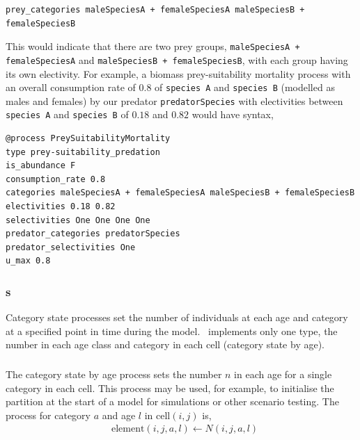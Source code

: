 {\small{\begin{verbatim}
prey_categories maleSpeciesA + femaleSpeciesA maleSpeciesB + femaleSpeciesB
\end{verbatim}}}

This would indicate that there are two prey groups, \texttt{maleSpeciesA + femaleSpeciesA} and \texttt{maleSpeciesB + femaleSpeciesB}, with each group having its own electivity. For example, a biomass prey-suitability mortality process with an overall consumption rate of $0.8$ of \texttt{species A} and \texttt{species B} (modelled as males and females) by our predator \texttt{predatorSpecies} with electivities between \texttt{species A} and \texttt{species B} of $0.18$ and $0.82$ would have syntax,

{\small{\begin{verbatim}
@process PreySuitabilityMortality
type prey-suitability_predation
is_abundance F
consumption_rate 0.8
categories maleSpeciesA + femaleSpeciesA maleSpeciesB + femaleSpeciesB
electivities 0.18 0.82
selectivities One One One One
predator_categories predatorSpecies
predator_selectivities One
u_max 0.8
\end{verbatim}}}

\subsubsection{s}

Category state processes set the number of individuals at each age and category at a specified point in time during the model. \SPM\ implements only one type, the number in each age class and category in each cell (category state by age).

\subsubsection*{}

The category state by age process sets the number $n$ in each age for a single category in each cell. This process may be used, for example, to initialise the partition at the start of a model for simulations or other scenario testing. The process for category $a$ and age $l$ in cell$(i,j)$ is,
\begin{equation}\begin{split}
  & \text{element}(i,j,a,l) \leftarrow N(i,j,a,l)
\end{split}\end{equation}

